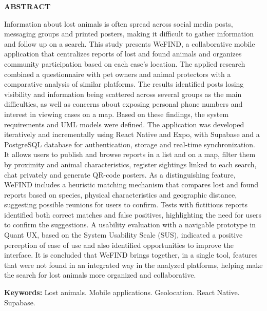 \thispagestyle{empty}

\begin{center}
    \textbf{\large ABSTRACT}
\end{center}

\vspace{14pt}

\begin{singlespace}
\noindent\justifying
Information about lost animals is often spread across social media posts, messaging groups and printed posters, making it difficult to gather information and follow up on a search. This study presents WeFIND, a collaborative mobile application that centralizes reports of lost and found animals and organizes community participation based on each case's location. The applied research combined a questionnaire with pet owners and animal protectors with a comparative analysis of similar platforms. The results identified posts losing visibility and information being scattered across several groups as the main difficulties, as well as concerns about exposing personal phone numbers and interest in viewing cases on a map. Based on these findings, the system requirements and UML models were defined. The application was developed iteratively and incrementally using React Native and Expo, with Supabase and a PostgreSQL database for authentication, storage and real-time synchronization. It allows users to publish and browse reports in a list and on a map, filter them by proximity and animal characteristics, register sightings linked to each search, chat privately and generate QR-code posters. As a distinguishing feature, WeFIND includes a heuristic matching mechanism that compares lost and found reports based on species, physical characteristics and geographic distance, suggesting possible reunions for users to confirm. Tests with fictitious reports identified both correct matches and false positives, highlighting the need for users to confirm the suggestions. A usability evaluation with a navigable prototype in Quant UX, based on the System Usability Scale (SUS), indicated a positive perception of ease of use and also identified opportunities to improve the interface. It is concluded that WeFIND brings together, in a single tool, features that were not found in an integrated way in the analyzed platforms, helping make the search for lost animals more organized and collaborative.

\vspace{18pt}

\noindent
\textbf{Keywords:} Lost animals. Mobile applications. Geolocation. React Native. Supabase.
\end{singlespace}

\clearpage

